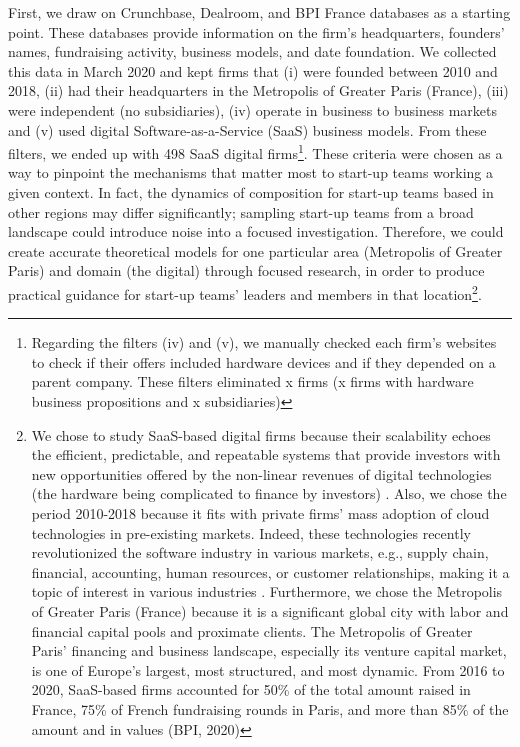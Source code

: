 \documentclass[12pt]{article}
\begin{document}
First, we draw on Crunchbase, Dealroom, and BPI France databases as a starting point. These databases provide information on the firm's headquarters, founders' names, fundraising activity, business models, and date foundation. We collected this data in March 2020 and kept firms that (i) were founded between 2010 and 2018, (ii) had their headquarters in the Metropolis of Greater Paris (France), (iii) were independent (no subsidiaries), (iv) operate in business to business markets and (v) used digital Software-as-a-Service (SaaS) business models. From these filters, we ended up with 498 SaaS digital firms\footnote{Regarding the filters (iv) and (v), we manually checked each firm's websites to check if their offers included hardware devices and if they depended on a parent company. These filters eliminated x firms (x firms with hardware business propositions and x subsidiaries)}. These criteria were chosen as a way to pinpoint the mechanisms that matter most to start-up teams working a given context. In fact, the dynamics of composition for start-up teams based in other regions may differ significantly; sampling start-up teams from a broad landscape could introduce noise into a focused investigation. Therefore, we could create accurate theoretical models for one particular area (Metropolis of Greater Paris) and domain (the digital) through focused research, in order to produce practical guidance for start-up teams' leaders and members in that location\footnote{We chose to study SaaS-based digital firms because their scalability echoes the efficient, predictable, and repeatable systems that provide investors with new opportunities offered by the non-linear revenues of digital technologies (the hardware being complicated to finance by investors) \citep{nambisan2017digital}. Also, we chose the period 2010-2018 because it fits with private firms' mass adoption of cloud technologies in pre-existing markets. Indeed, these technologies recently revolutionized the software industry in various markets, e.g., supply chain, financial, accounting, human resources, or customer relationships, making it a topic of interest in various industries \citep{luoma2018exploring}. Furthermore, we chose the Metropolis of Greater Paris (France) because it is a significant global city with labor and financial capital pools and proximate clients. The Metropolis of Greater Paris' financing and business landscape, especially its venture capital market, is one of Europe's largest, most structured, and most dynamic. From 2016 to 2020, SaaS-based firms accounted for 50\% of the total amount raised in France, 75\% of French fundraising rounds in Paris, and more than 85\% of the amount and in values (BPI, 2020)}. \\
\end{document}
